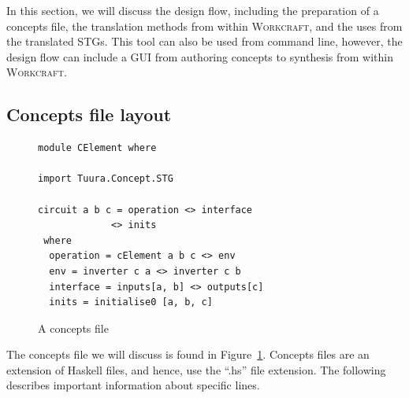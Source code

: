 \documentclass[british,conference,compsoc]{IEEEtran}
\newcommand{\noun}[1]{\textsc{#1}}
\begin{document}
\vspace{-2mm}

In this section, we will discuss the design flow, including the preparation of 
a concepts file, the translation methods from within \noun{Workcraft}, and 
the uses from the translated STGs. This tool can also be used from command line,
however, the design flow can include a GUI from authoring concepts to synthesis
from within \noun{Workcraft}. 

\vspace{-3mm}

\subsection{Concepts file layout \label{sub:file_layout}}

\vspace{-3mm}

\begin{figure}[h]
\begin{centering}

\begin{verbatim}
module CElement where

import Tuura.Concept.STG

circuit a b c = operation <> interface 
             <> inits 
 where
  operation = cElement a b c <> env
  env = inverter c a <> inverter c b
  interface = inputs[a, b] <> outputs[c] 
  inits = initialise0 [a, b, c]
\end{verbatim}

\par\end{centering}
\vspace{-2mm}
\begin{centering}
\protect\caption{\label{fig:concepts_file}A concepts file}
\vspace{-2mm}
\par\end{centering}

\end{figure}

The concepts file we will discuss is found in Figure~\ref{fig:concepts_file}.
Concepts files are an extension of Haskell files, and hence, use the ``.hs'' file extension.
The following describes important information about specific lines.
\end{document}
